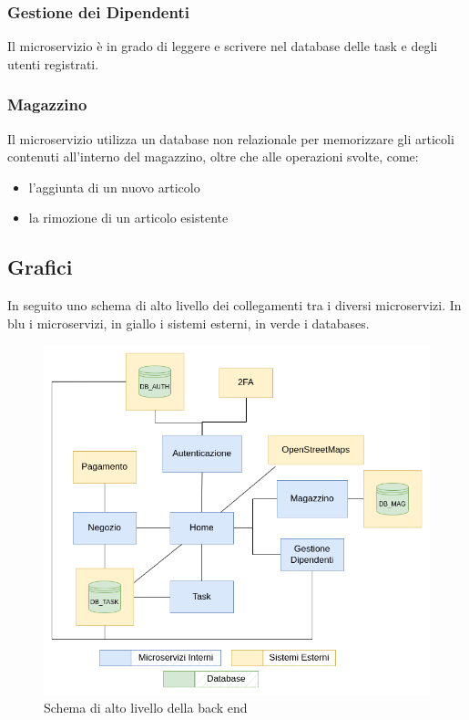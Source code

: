 \documentclass{report}
\begin{document}
\subsubsection*{Gestione dei Dipendenti}
Il microservizio è in grado di leggere e scrivere nel database delle task e degli utenti registrati.

\subsubsection*{Magazzino}
Il microservizio utilizza un database non relazionale per memorizzare gli articoli contenuti all’interno del magazzino, oltre che alle operazioni svolte, come:

\begin{itemize}
	\item l’aggiunta di un nuovo articolo
	
	\item la rimozione di un articolo esistente
\end{itemize}

\subsection{Grafici}

In seguito uno schema di alto livello dei collegamenti tra i diversi microservizi. In blu i microservizi, in giallo i sistemi esterni, in verde i databases.

\begin{figure}[h]
	\centering
	\includegraphics[width=1\textwidth]{images/back_end_short}
	\caption{Schema di alto livello della back end}
\end{figure}	
\end{document}
